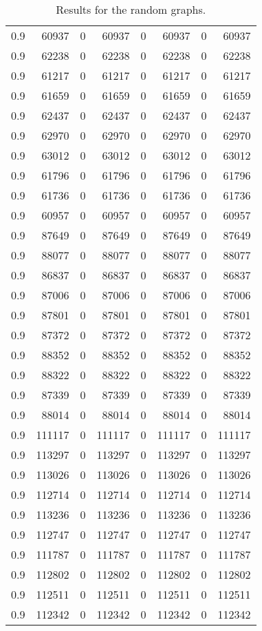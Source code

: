 \documentclass{scrartcl}
\theoremstyle{plain}
\begin{document}
\begin{table}[!ht]
\begin{tabular}{|l|rr|rr|rr|r|}
0.9 & 60937 & 0 & 60937 & 0 & 60937 & 0 & 60937 \\ 
0.9 & 62238 & 0 & 62238 & 0 & 62238 & 0 & 62238 \\ 
0.9 & 61217 & 0 & 61217 & 0 & 61217 & 0 & 61217 \\ 
0.9 & 61659 & 0 & 61659 & 0 & 61659 & 0 & 61659 \\ 
0.9 & 62437 & 0 & 62437 & 0 & 62437 & 0 & 62437 \\ 
0.9 & 62970 & 0 & 62970 & 0 & 62970 & 0 & 62970 \\ 
0.9 & 63012 & 0 & 63012 & 0 & 63012 & 0 & 63012 \\ 
0.9 & 61796 & 0 & 61796 & 0 & 61796 & 0 & 61796 \\ 
0.9 & 61736 & 0 & 61736 & 0 & 61736 & 0 & 61736 \\ 
0.9 & 60957 & 0 & 60957 & 0 & 60957 & 0 & 60957 \\ 
0.9 & 87649 & 0 & 87649 & 0 & 87649 & 0 & 87649 \\ 
0.9 & 88077 & 0 & 88077 & 0 & 88077 & 0 & 88077 \\ 
0.9 & 86837 & 0 & 86837 & 0 & 86837 & 0 & 86837 \\ 
0.9 & 87006 & 0 & 87006 & 0 & 87006 & 0 & 87006 \\ 
0.9 & 87801 & 0 & 87801 & 0 & 87801 & 0 & 87801 \\ 
0.9 & 87372 & 0 & 87372 & 0 & 87372 & 0 & 87372 \\ 
0.9 & 88352 & 0 & 88352 & 0 & 88352 & 0 & 88352 \\ 
0.9 & 88322 & 0 & 88322 & 0 & 88322 & 0 & 88322 \\ 
0.9 & 87339 & 0 & 87339 & 0 & 87339 & 0 & 87339 \\ 
0.9 & 88014 & 0 & 88014 & 0 & 88014 & 0 & 88014 \\ 
0.9 & 111117 & 0 & 111117 & 0 & 111117 & 0 & 111117 \\ 
0.9 & 113297 & 0 & 113297 & 0 & 113297 & 0 & 113297 \\ 
0.9 & 113026 & 0 & 113026 & 0 & 113026 & 0 & 113026 \\ 
0.9 & 112714 & 0 & 112714 & 0 & 112714 & 0 & 112714 \\ 
0.9 & 113236 & 0 & 113236 & 0 & 113236 & 0 & 113236 \\ 
0.9 & 112747 & 0 & 112747 & 0 & 112747 & 0 & 112747 \\ 
0.9 & 111787 & 0 & 111787 & 0 & 111787 & 0 & 111787 \\ 
0.9 & 112802 & 0 & 112802 & 0 & 112802 & 0 & 112802 \\ 
0.9 & 112511 & 0 & 112511 & 0 & 112511 & 0 & 112511 \\ 
0.9 & 112342 & 0 & 112342 & 0 & 112342 & 0 & 112342 \\ 
 

\hline
\end{tabular}

	\caption{\label{tab:random_sto}Results for the random graphs.}
\end{table}
\end{document}
